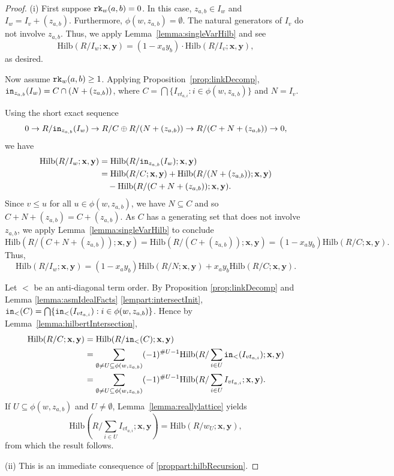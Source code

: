 \documentclass[12pt,reqno]{amsart}
\newtheorem{Main Conjecture}[theorem]{Main Conjecture}
\theoremstyle{remark}
\theoremstyle{plain}
\newcommand{\init}{{\tt in}}
\newcommand{\hilb}{\mbox{Hilb}}
\newcommand{\rk}{{\tt rk}}
\begin{document}
\begin{proof}

\noindent (i) First suppose $\rk_w(a,b)=0$.  In this case, $z_{a,b}\in I_w$ and $I_w=I_v+(z_{a,b})$.  Furthermore, $\phi(w,z_{a,b})=\emptyset$.  The natural generators of $I_v$ do not involve $z_{a,b}$.  Thus, we apply Lemma~\ref{lemma:singleVarHilb} and see
\[\hilb(R/I_w;\mathbf x,\mathbf y)=\left(1-x_ay_b\right) \cdot \hilb(R/I_v;\mathbf x,\mathbf y),\] as desired.

Now assume $\rk_w(a,b)\geq 1$.  Applying Proposition~\ref{prop:linkDecomp}, $\init_{z_{a,b}}(I_w)= C \cap (N+(z_{a,b}))$, where 
$C=\bigcap\{I_{v t_{a,i}}:i\in \phi (w,z_{a,b})\}$
and $N=I_v$.

Using the short exact sequence \[
0 \rightarrow R/\init_{z_{a,b}}(I_w) \rightarrow R/C \oplus R/(N+(z_{a,b})) \rightarrow R/(C+N+(z_{a,b})) \rightarrow 0,
\] we have 
\begin{align*}
    \hilb(R/I_w;\mathbf x,\mathbf y)&= \hilb(R/\init_{z_{a,b}}(I_w);\mathbf x,\mathbf y)\\
    &=\hilb(R/C;\mathbf x,\mathbf y)+\hilb(R/(N+(z_{a,b}));\mathbf x,\mathbf y)\\
    &\quad -\hilb(R/(C+N+(z_{a,b}));\mathbf x,\mathbf y).
\end{align*}
Since $v\leq u$ for all $u\in \phi(w,z_{a,b})$, we have $N\subseteq C$ and so $C+N+(z_{a,b})=C+(z_{a,b})$.  As $C$ has a generating set that does not involve $z_{a,b}$, we apply Lemma~\ref{lemma:singleVarHilb} to conclude \[\hilb(R/(C+N+(z_{a,b}));\mathbf x,\mathbf y)=\hilb(R/(C+(z_{a,b}));\mathbf x,\mathbf y)=\left(1-x_ay_b\right)\hilb(R/C;\mathbf x,\mathbf y).\]
Thus, 
\[\hilb(R/I_w;\mathbf x,\mathbf y)=\left(1-x_ay_b\right)\hilb(R/N;\mathbf x,\mathbf y)+x_ay_b\hilb(R/C;\mathbf x,\mathbf y).\]

Let $<$ be an anti-diagonal term order.  By Proposition \ref{prop:linkDecomp} and Lemma \ref{lemma:asmIdealFacts} \ref{lempart:intersectInit}, $\init_<(C) = \bigcap \{\init_<(I_{vt_{a,i}}) : i \in \phi(w,z_{a,b})\}$.  Hence by Lemma~\ref{lemma:hilbertIntersection}, 
\begin{align*}\hilb(R/C;\mathbf x,\mathbf y)&=\hilb(R/\init_<(C);\mathbf x,\mathbf y) \\
&= \sum_{ \emptyset \neq U\subseteq \phi(w,z_{a,b})}(-1)^{\#U-1} \hilb(R/\sum_{i\in U} \init_<(I_{vt_{a,i}});\mathbf x,\mathbf y)\\
&= \sum_{ \emptyset \neq U\subseteq \phi(w,z_{a,b})}(-1)^{\#U-1} \hilb(R/\sum_{i\in U} I_{vt_{a,i}};\mathbf x,\mathbf y).
\end{align*}
If $U\subseteq \phi(w,z_{a,b})$ and $U\neq \emptyset$, Lemma~\ref{lemma:reallylattice} yields
\[\hilb(R/\sum_{i\in U} I_{vt_{a,i}};\mathbf x,\mathbf y)=\hilb(R/w_U;\mathbf x,\mathbf y),\]
from which the result follows. 

\noindent (ii) This is an immediate consequence of \ref{proppart:hilbRecursion}.
\end{proof}
\end{document}
